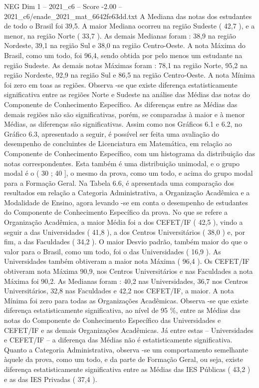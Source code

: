 \begin{textsample}{NEG Dim 1 – 2021\_c6 – Score -2.00 – 2021\_c6/enade\_2021\_mat\_6642fe63dd.txt}
A Mediana das notas dos estudantes de todo o Brasil foi 39,5.
A maior Mediana ocorreu na região Sudeste ( 42,7 ), e a menor, na região Norte ( 33,7 ).
As demais Medianas foram : 38,9 na região Nordeste, 39,1 na região Sul e 38,0 na região Centro-Oeste.
A nota Máxima do Brasil, como um todo, foi 96,4, sendo obtida por pelo menos um estudante na região Sudeste.
As demais notas Máximas foram : 78,1 na região Norte, 95,2 na região Nordeste, 92,9 na região Sul e 86,5 na região Centro-Oeste.
A nota Mínima foi zero em toas as regiões.
Observa -se que existe diferença estatisticamente significativa entre as regiões Norte e Sudeste na análise das Médias das notas do Componente de Conhecimento Específico.
As diferenças entre as Médias das demais regiões não são significativas, porém, se comparadas à maior e à menor Médias, as diferenças são significativas.
Assim como nos Gráficos 6.1 e 6.2, no Gráfico 6.3, apresentado a seguir, é possível ser feita uma avaliação do desempenho de concluintes de Licenciatura em Matemática, em relação ao Componente de Conhecimento Específico, com um histograma da distribuição das notas correspondentes.
Esta também é uma distribuição unimodal, e o grupo modal é o ( 30 ; 40 ], o mesmo da prova, como um todo, e acima do grupo modal para a Formação Geral.
Na Tabela 6.6, é apresentada uma comparação dos resultados em relação a Categoria Administrativa, a Organização Acadêmica e a Modalidade de Ensino, agora levando -se em conta o desempenho de estudantes do Componente de Conhecimento Específico da prova.
No que se refere a Organização Acadêmica, a maior Média foi a dos CEFET/IF ( 42,5 ), vindo a seguir a das Universidades ( 41,8 ), a dos Centros Universitários ( 38,0 ) e, por fim, a das Faculdades ( 34,2 ).
O maior Desvio padrão, também maior do que o valor para o Brasil, como um todo, foi o das Universidades ( 16,9 ).
As Universidades também obtiveram a maior nota Máxima ( 96,4 ).
Os CEFET/IF obtiveram nota Máxima 90,9, nos Centros Universitários e nas Faculdades a nota Máxima foi 90,2.
As Medianas foram : 40,2 nas Universidades, 36,7 nos Centros Universitários, 32,8 nas Faculdades e 42,2 nos CEFET/IF, a maior.
A nota Mínima foi zero para todas as Organizações Acadêmicas.
Observa -se que existe diferença estatisticamente significativa, ao nível de 95 \%, entre as Médias das notas do Componente de Conhecimento Específico das Universidades e CEFET/IF e as demais Organizações Acadêmicas.
Já entre estas – Universidades e CEFET/IF – a diferença das Médias não é estatisticamente significativa.
Quanto a Categoria Administrativa, observa -se um comportamento semelhante àquele da prova, como um todo, e da parte de Formação Geral, ou seja, existe diferença estatisticamente significativa entre as Médias das IES Públicas ( 43,2 ) e as das IES Privadas ( 37,4 ).

\end{textsample}

